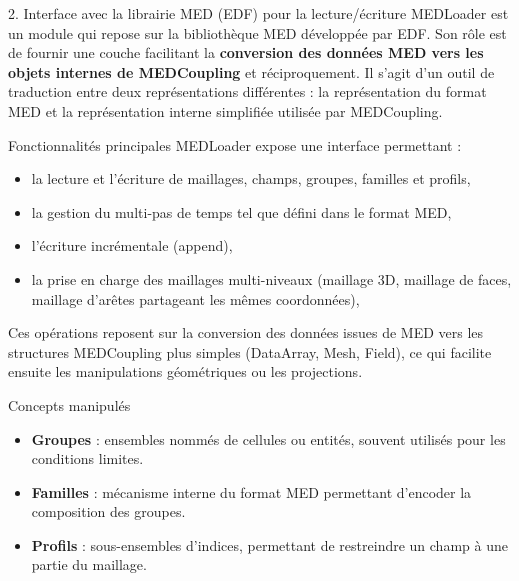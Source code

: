 \begin{frame}{2. Interface avec la librairie MED (EDF) pour la
lecture/écriture}
\protect\hypertarget{interface-avec-la-librairie-med-edf-pour-la-lectureuxe9criture}{}
MEDLoader est un module qui repose sur la bibliothèque MED développée
par EDF. Son rôle est de fournir une couche facilitant la
\textbf{conversion des données MED vers les objets internes de
MEDCoupling} et réciproquement. Il s'agit d'un outil de traduction entre
deux représentations différentes : la représentation du format MED et la
représentation interne simplifiée utilisée par MEDCoupling.

\begin{block}{Fonctionnalités principales}
\protect\hypertarget{fonctionnalituxe9s-principales}{}
MEDLoader expose une interface permettant :

\begin{itemize}
\tightlist
\item
  la lecture et l'écriture de maillages, champs, groupes, familles et
  profils,
\item
  la gestion du multi-pas de temps tel que défini dans le format MED,
\item
  l'écriture incrémentale (append),
\item
  la prise en charge des maillages multi-niveaux (maillage 3D, maillage
  de faces, maillage d'arêtes partageant les mêmes coordonnées),
\end{itemize}

Ces opérations reposent sur la conversion des données issues de MED vers
les structures MEDCoupling plus simples (DataArray, Mesh, Field), ce qui
facilite ensuite les manipulations géométriques ou les projections.
\end{block}

\begin{block}{Concepts manipulés}
\protect\hypertarget{concepts-manipuluxe9s}{}
\begin{itemize}
\tightlist
\item
  \textbf{Groupes} : ensembles nommés de cellules ou entités, souvent
  utilisés pour les conditions limites.
\item
  \textbf{Familles} : mécanisme interne du format MED permettant
  d'encoder la composition des groupes.
\item
  \textbf{Profils} : sous-ensembles d'indices, permettant de restreindre
  un champ à une partie du maillage.
\end{itemize}
\end{block}


\end{frame}
